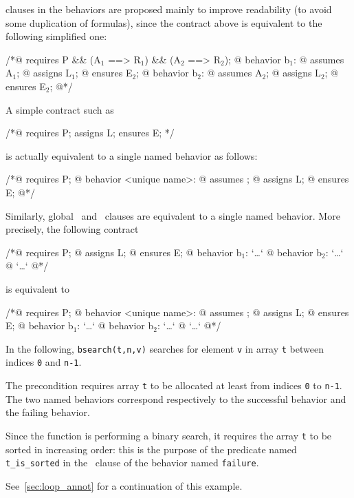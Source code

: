 \requires{} clauses in the behaviors are proposed
mainly to improve readability (to avoid some duplication of
formulas), since the contract above is equivalent to the following
simplified one:
\begin{listing}{1}
/*@ requires P && (A$_1$ ==> R$_1$) && (A$_2$ ==> R$_2$);
  @ behavior b$_1$:
  @   assumes A$_1$;
  @   assigns L$_1$;
  @   ensures E$_2$;
  @ behavior b$_2$:
  @   assumes A$_2$;
  @   assigns L$_2$;
  @   ensures E$_2$;
  @*/
\end{listing}

A simple contract such as
\begin{listing}{1}
/*@ requires P; assigns L; ensures E; */
\end{listing}
is actually equivalent to a single named behavior as follows:
\begin{listing}{1}
/*@ requires P;
  @ behavior <unique name>:
  @   assumes \true;
  @   assigns L;
  @   ensures E;
  @*/
\end{listing}
Similarly, global \assigns\ and \ensures\ clauses are equivalent to a
single named behavior. More precisely, the following contract
\begin{listing}{1}
/*@ requires P;
  @ assigns L;
  @ ensures E;
  @ behavior b$_1$: `\dots`
  @ behavior b$_2$: `\dots`
  @ `\dots`
  @*/
\end{listing}
is equivalent to
\begin{listing}{1}
/*@ requires P;
  @ behavior <unique name>:
  @   assumes \true;
  @   assigns L;
  @   ensures E;
  @ behavior b$_1$: `\dots`
  @ behavior b$_2$: `\dots`
  @ `\dots`
  @*/
\end{listing}

\begin{example}
\label{ex:bsearch}
In the following, \lstinline|bsearch(t,n,v)| searches for element \lstinline|v|
in array \lstinline|t| between indices \lstinline|0| and \lstinline|n-1|.

%
The precondition requires array \lstinline|t| to be allocated at least
from indices \lstinline|0|
to \lstinline|n-1|. The two named behaviors
correspond respectively to the successful behavior and the failing
behavior.

Since the function is performing a binary search, it requires the
array \lstinline|t| to be sorted in increasing order: this is the purpose of
the predicate named \lstinline|t_is_sorted| in the \assumes\ clause of the
behavior named \lstinline|failure|.

See~\ref{sec:loop_annot} for a continuation of this example.
\end{example}

